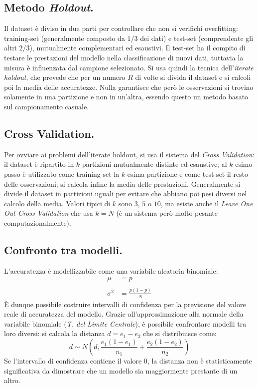 \documentclass[11pt, a4page, twocolumn]{article}
\begin{document}
\subsection{Metodo \textit{Holdout}.}
Il dataset è diviso in due parti per controllare che non si verifichi overfitting: training-set (generalmente composto da $1/3$ dei dati) e test-set (comprendente gli altri $2/3$), mutualmente complementari ed esaustivi.
Il test-set ha il compito di testare le prestazioni del modello nella classificazione di nuovi dati, tuttavia la misura è influenzata dal campione selezionato.
Si usa quindi la tecnica dell'\textit{iterate holdout}, che prevede che per un numero $R$ di volte si divida il dataset e si calcoli poi la media delle accuratezze.
Nulla garantisce che però le osservazioni si trovino solamente in una partizione e non in un'altra, essendo questo un metodo basato sul campionamento casuale.

\subsection{Cross Validation.}
Per ovviare ai problemi dell'iterate holdout, si usa il sistema del \textit{Cross Validation}: il dataset è ripartito in $k$ partizioni mutualmente distinte ed esaustive; al $k$-esimo passo è utilizzato come training-set la $k$-esima partizione e come test-set il resto delle osservazioni; si calcola infine la media delle prestazioni.
Generalmente si divide il dataset in partizioni uguali per evitare che abbiano poi pesi diversi nel calcolo della media.
Valori tipici di $k$ sono $3$, $5$ o $10$, ma esiste anche il \textit{Leave One Out Cross Validation} che usa $k = N$ (è un sistema però molto pesante computazionalmente).

\subsection{Confronto tra modelli.}
L'accuratezza è modellizzabile come una variabile aleatoria binomiale:
\begin{align*}
  \mu &= p \\ \\
  \sigma^2 &= \frac{p (1 - p)}{N}
\end{align*}
È dunque possibile costruire intervalli di confidenza per la previsione del valore reale di accuratezza del modello.
Grazie all'approssimazione alla normale della variabile binomiale (\textit{T. del Limite Centrale}), è possibile confrontare modelli tra loro diversi: si calcola la distanza $d = e_1 - e_2$ che si distribuisce come:
\begin{equation*}
  d \sim N(d, \frac{e_1 (1 - e_1)}{n_1} + \frac{e_2 (1 - e_2)}{n_2})
\end{equation*}
Se l'intervallo di confidenza contiene il valore $0$, la distanza non è statisticamente significativa da dimostrare che un modello sia maggiormente prestante di un altro.
\end{document}
